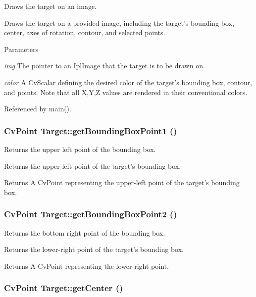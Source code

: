 Draws the target on an image. 

Draws the target on a provided image, including the target's bounding box, center, axes of rotation, contour, and selected points. 
\begin{DoxyParams}{Parameters}
\item[{\em img}]The pointer to an IplImage that the target is to be drawn on. \item[{\em color}]A CvScalar defining the desired color of the target's bounding box, contour, and points. Note that all X,Y,Z values are rendered in their conventional colors. \end{DoxyParams}


Referenced by main().

\hypertarget{classTarget_a242ea75595d6ecf0aa93cbaff4a86464}{
\subsubsection[{getBoundingBoxPoint1}]{\setlength{\rightskip}{0pt plus 5cm}CvPoint Target::getBoundingBoxPoint1 ()}}
\label{classTarget_a242ea75595d6ecf0aa93cbaff4a86464}


Returns the upper left point of the bounding box. 

Returns the upper-\/left point of the target's bounding box. \begin{DoxyReturn}{Returns}
A CvPoint representing the upper-\/left point of the target's bounding box. 
\end{DoxyReturn}
\hypertarget{classTarget_ac8d03387c639c9acf18c056a8d36bd29}{
\subsubsection[{getBoundingBoxPoint2}]{\setlength{\rightskip}{0pt plus 5cm}CvPoint Target::getBoundingBoxPoint2 ()}}
\label{classTarget_ac8d03387c639c9acf18c056a8d36bd29}


Returns the bottom right point of the bounding box. 

Returns the lower-\/right point of the target's bounding box. \begin{DoxyReturn}{Returns}
A CvPoint representing the lower-\/right point. 
\end{DoxyReturn}
\hypertarget{classTarget_a1746d549afb1a3df93f38bf6e57a1512}{
\subsubsection[{getCenter}]{\setlength{\rightskip}{0pt plus 5cm}CvPoint Target::getCenter ()}}
\label{classTarget_a1746d549afb1a3df93f38bf6e57a1512}



